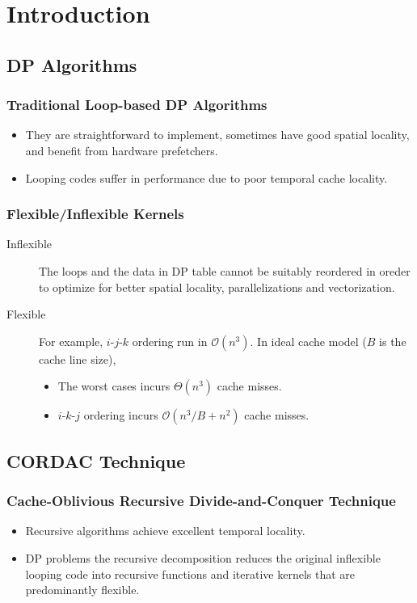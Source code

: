 \section{Introduction}

\subsection{DP Algorithms}
\begin{frame}
    \frametitle{Traditional Loop-based DP Algorithms}
	\begin{itemize}
		\item They are straightforward to implement, 
			sometimes have good spatial locality, and benefit from hardware
			prefetchers.
		\item Looping codes suffer in performance due to poor temporal cache
			locality.
	\end{itemize}
\end{frame}

\begin{frame}
    \frametitle{Flexible/Inflexible Kernels}
	\begin{description}
		\item[Inflexible] The loops and the data in DP table cannot be suitably
			reordered in oreder to optimize for better spatial locality,
			parallelizations and vectorization.
		\item[Flexible] For example, $i$-$j$-$k$ ordering run in $\mathcal{O}(n^3)$.
			In ideal cache model ($B$ is the cache line size),
			\begin{itemize}
				\item The worst cases incurs $\Theta(n^3)$ cache misses.
				\item $i$-$k$-$j$ ordering incurs $\mathcal{O}(n^3/B + n^2)$ cache misses.
			\end{itemize}
	\end{description}
\end{frame}

\subsection{CORDAC Technique}
\begin{frame}
    \frametitle{Cache-Oblivious Recursive Divide-and-Conquer Technique}
	\begin{itemize}
		\item Recursive algorithms achieve excellent temporal locality.
		\item DP problems the recursive decomposition reduces the original 
			inflexible looping code into recursive functions and iterative kernels 
			that are predominantly flexible.
	\end{itemize}
\end{frame}

